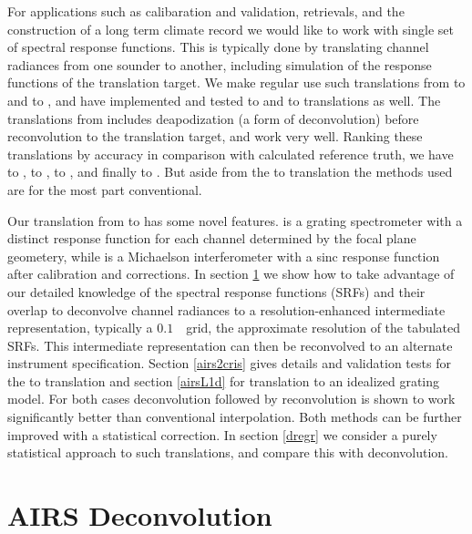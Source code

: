 \documentclass[10pt,twocolumn]{article}
\begin{document}
For applications such as calibaration and validation, retrievals,
and the construction of a long term climate record we would like to
work with single set of spectral response functions.  This is
typically done by translating channel radiances from one sounder to
another, including simulation of the response functions of the
translation target.  We make regular use such translations from
{\airs} to {\cris} and {\iasi} to {\cris}, and have implemented and
tested {\iasi} to {\airs} and {\cris} to {\airs} translations as
well.  The translations from {\iasi} includes deapodization (a form
of deconvolution) before reconvolution to the translation target,
and work very well.  Ranking these translations by accuracy in
comparison with calculated reference truth, we have {\iasi} to
{\cris}, {\iasi} to {\airs}, {\airs} to {\cris}, and finally {\cris}
to {\airs} \cite{git:decon}.  But aside from the {\airs} to {\cris}
translation the methods used are for the most part conventional.

Our translation from {\airs} to {\cris} has some novel features.
{\airs} is a grating spectrometer with a distinct response function
for each channel determined by the focal plane geometery, while
{\cris} is a Michaelson interferometer with a sinc response
function after calibration and corrections.  In section \ref{decon}
we show how to take advantage of our detailed knowledge of the
{\airs} spectral response functions (SRFs) and their overlap to
deconvolve channel radiances to a resolution-enhanced intermediate
representation, typically a $0.1$~\wn\ grid, the approximate
resolution of the tabulated {\airs} SRFs.  
This intermediate representation can then be reconvolved to an
alternate instrument specification.  Section \ref{airs2cris} gives
details and validation tests for the {\airs} to {\cris} translation
and section \ref{airsL1d} for translation to an idealized grating
model.  For both cases deconvolution followed by reconvolution is
shown to work significantly better than conventional interpolation.
Both methods can be further improved with a statistical correction.
In section \ref{dregr} we consider a purely statistical approach to
such translations, and compare this with deconvolution.

\section{AIRS Deconvolution}
\label{decon}
\end{document}

